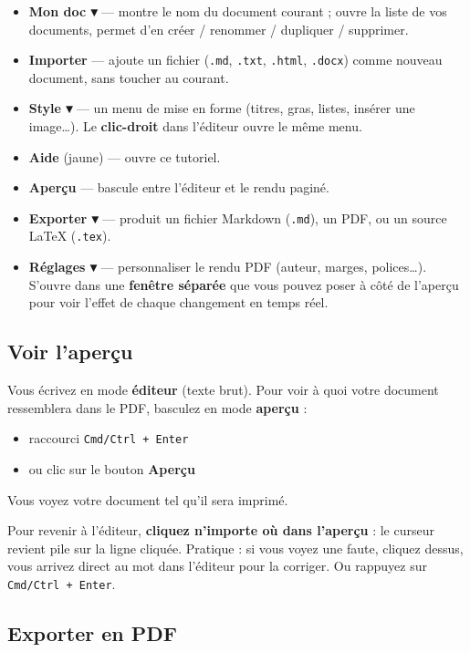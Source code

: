 \documentclass[11pt,a4paper]{article}
\theoremstyle{definition}
\begin{document}
\begin{itemize}
  \item \textbf{Mon doc ▾} — montre le nom du document courant ; ouvre la liste
de vos documents, permet d'en créer / renommer / dupliquer /
supprimer.
  \item \textbf{Importer} — ajoute un fichier (\texttt{.md}, \texttt{.txt}, \texttt{.html},
\texttt{.docx}) comme nouveau document, sans toucher au courant.
  \item \textbf{Style ▾} — un menu de mise en forme (titres, gras, listes,
insérer une image…). Le \textbf{clic-droit} dans l'éditeur ouvre le
même menu.
  \item \textbf{Aide} (jaune) — ouvre ce tutoriel.
  \item \textbf{Aperçu} — bascule entre l'éditeur et le rendu paginé.
  \item \textbf{Exporter ▾} — produit un fichier Markdown (\texttt{.md}), un PDF, ou
un source LaTeX (\texttt{.tex}).
  \item \textbf{Réglages ▾} — personnaliser le rendu PDF (auteur, marges,
polices…). S'ouvre dans une \textbf{fenêtre séparée} que vous pouvez
poser à côté de l'aperçu pour voir l'effet de chaque changement
en temps réel.
\end{itemize}


\subsection{Voir l'aperçu}

Vous écrivez en mode \textbf{éditeur} (texte brut). Pour voir à quoi votre
document ressemblera dans le PDF, basculez en mode \textbf{aperçu} :


\begin{itemize}
  \item raccourci \texttt{Cmd/Ctrl + Enter}
  \item ou clic sur le bouton \textbf{Aperçu}
\end{itemize}


Vous voyez votre document tel qu'il sera imprimé.


Pour revenir à l'éditeur, \textbf{cliquez n'importe où dans l'aperçu} : le
curseur revient pile sur la ligne cliquée. Pratique : si vous voyez
une faute, cliquez dessus, vous arrivez direct au mot dans l'éditeur
pour la corriger. Ou rappuyez sur \texttt{Cmd/Ctrl + Enter}.


\subsection{Exporter en PDF}
\end{document}
